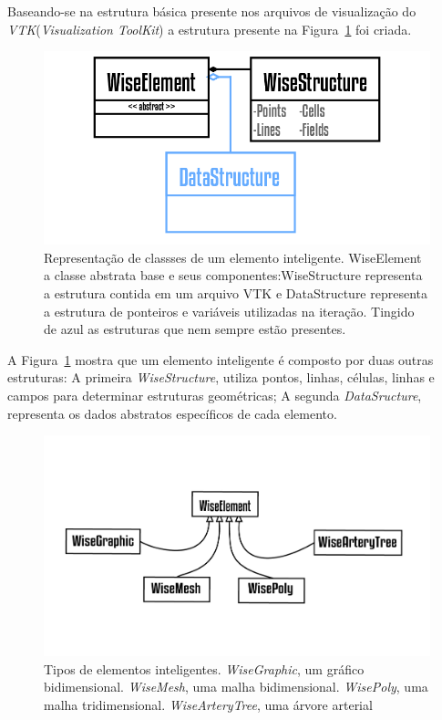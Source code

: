 \documentclass[
        english,			
        brazil			        %
        ,<...>]{abntbibufjf}
\begin{document}
Baseando-se na estrutura básica presente nos arquivos de visualização do \textit{VTK}(\textit{Visualization ToolKit}) a estrutura presente na Figura~\ref{fig2:wiselement} foi criada.

\begin{figure}[!htbp]
	\centering
	\includegraphics[scale=1]{Figures/WiseElement.png}
	\caption{Representação de classses de um elemento inteligente. WiseElement a classe abstrata base e seus componentes:WiseStructure representa a estrutura contida em um arquivo VTK e DataStructure representa a estrutura de ponteiros e variáveis utilizadas na iteração. Tingido de azul as estruturas que nem sempre estão presentes.}
	\label{fig2:wiselement}
\end{figure}

A Figura~\ref{fig2:wiselement} mostra que um elemento inteligente é composto por duas outras estruturas: A primeira \textit{WiseStructure}, utiliza pontos, linhas, células, linhas e campos para determinar estruturas geométricas; A segunda \textit{DataSructure}, representa os dados abstratos específicos de cada elemento.

\begin{figure}[!htbp]
	\centering
	\includegraphics[scale=0.8]{Figures/WiseElements.png}
	\caption{Tipos de elementos inteligentes. \textit{WiseGraphic}, um gráfico bidimensional. \textit{WiseMesh}, uma malha bidimensional. \textit{WisePoly}, uma malha tridimensional. \textit{WiseArteryTree}, uma árvore arterial}
	\label{fig2:wiselements}
\end{figure}
\end{document}
